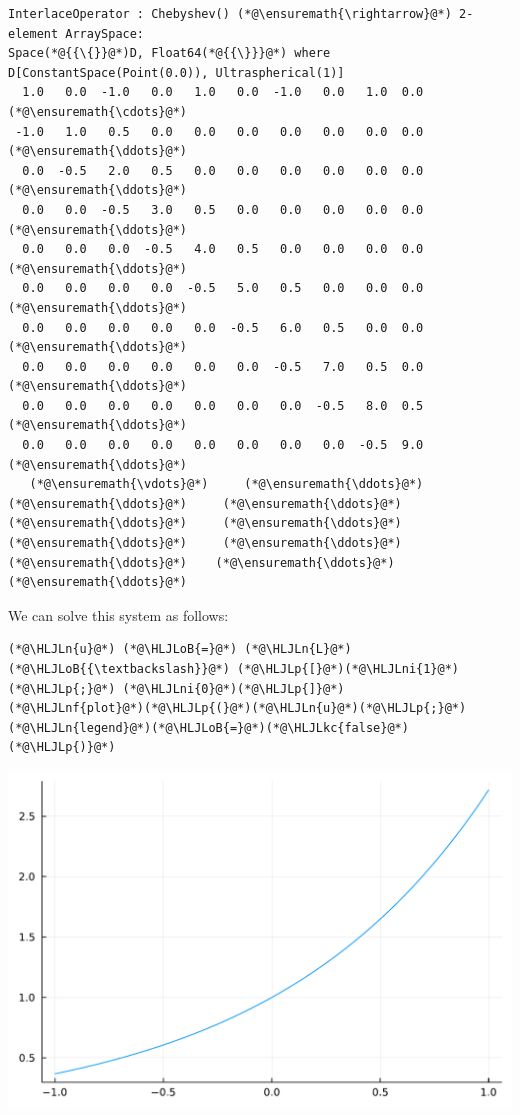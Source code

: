 \documentclass[12pt,a4paper]{article}
\newcommand{\HLJLkc}[1]{\textcolor[RGB]{59,151,46}{\textit{#1}}}
\newcommand{\HLJLn}[1]{#1}
\newcommand{\HLJLnf}[1]{\textcolor[RGB]{66,102,213}{#1}}
\newcommand{\HLJLni}[1]{\textcolor[RGB]{59,151,46}{#1}}
\newcommand{\HLJLoB}[1]{\textcolor[RGB]{102,102,102}{\textbf{#1}}}
\newcommand{\HLJLp}[1]{#1}
\begin{document}
\begin{lstlisting}
InterlaceOperator : Chebyshev() (*@\ensuremath{\rightarrow}@*) 2-element ArraySpace:
Space(*@{{\{}}@*)D, Float64(*@{{\}}}@*) where D[ConstantSpace(Point(0.0)), Ultraspherical(1)]
  1.0   0.0  -1.0   0.0   1.0   0.0  -1.0   0.0   1.0  0.0  (*@\ensuremath{\cdots}@*)
 -1.0   1.0   0.5   0.0   0.0   0.0   0.0   0.0   0.0  0.0  (*@\ensuremath{\ddots}@*)
  0.0  -0.5   2.0   0.5   0.0   0.0   0.0   0.0   0.0  0.0  (*@\ensuremath{\ddots}@*)
  0.0   0.0  -0.5   3.0   0.5   0.0   0.0   0.0   0.0  0.0  (*@\ensuremath{\ddots}@*)
  0.0   0.0   0.0  -0.5   4.0   0.5   0.0   0.0   0.0  0.0  (*@\ensuremath{\ddots}@*)
  0.0   0.0   0.0   0.0  -0.5   5.0   0.5   0.0   0.0  0.0  (*@\ensuremath{\ddots}@*)
  0.0   0.0   0.0   0.0   0.0  -0.5   6.0   0.5   0.0  0.0  (*@\ensuremath{\ddots}@*)
  0.0   0.0   0.0   0.0   0.0   0.0  -0.5   7.0   0.5  0.0  (*@\ensuremath{\ddots}@*)
  0.0   0.0   0.0   0.0   0.0   0.0   0.0  -0.5   8.0  0.5  (*@\ensuremath{\ddots}@*)
  0.0   0.0   0.0   0.0   0.0   0.0   0.0   0.0  -0.5  9.0  (*@\ensuremath{\ddots}@*)
   (*@\ensuremath{\vdots}@*)     (*@\ensuremath{\ddots}@*)     (*@\ensuremath{\ddots}@*)     (*@\ensuremath{\ddots}@*)     (*@\ensuremath{\ddots}@*)     (*@\ensuremath{\ddots}@*)     (*@\ensuremath{\ddots}@*)     (*@\ensuremath{\ddots}@*)     (*@\ensuremath{\ddots}@*)    (*@\ensuremath{\ddots}@*)   (*@\ensuremath{\ddots}@*)
\end{lstlisting}


We can solve this system as follows:


\begin{lstlisting}
(*@\HLJLn{u}@*) (*@\HLJLoB{=}@*) (*@\HLJLn{L}@*) (*@\HLJLoB{{\textbackslash}}@*) (*@\HLJLp{[}@*)(*@\HLJLni{1}@*)(*@\HLJLp{;}@*) (*@\HLJLni{0}@*)(*@\HLJLp{]}@*)
(*@\HLJLnf{plot}@*)(*@\HLJLp{(}@*)(*@\HLJLn{u}@*)(*@\HLJLp{;}@*)(*@\HLJLn{legend}@*)(*@\HLJLoB{=}@*)(*@\HLJLkc{false}@*)(*@\HLJLp{)}@*)
\end{lstlisting}

\includegraphics[width=\linewidth]{jl_dOthw0/OP_methods_37_1.pdf}
\end{document}
